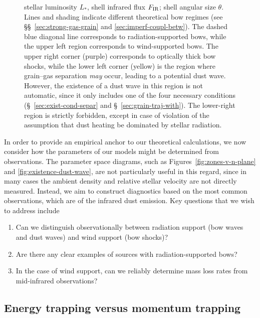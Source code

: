 \message{ !name(bs-bw-dw-03.tex)}\documentclass[useAMS, usenatbib, a4paper]{mnras}
\begin{document}
\begin{figure}
{    stellar luminosity \(L_*\), shell infrared flux \(F_{\text{IR}}\); shell
    angular size \(\theta\).  Lines and shading indicate different
    theoretical bow regimes (see \S\S~\ref{sec:strong-gas-grain} and
    \ref{sec:imperf-coupl-betw}).  The dashed blue diagonal line
    corresponds to radiation-supported bows, while the upper left
    region corresponds to wind-supported bows.  The upper right corner
    (purple) corresponds to optically thick bow shocks, while the
    lower left corner (yellow) is the region where grain--gas
    separation \textit{may} occur, leading to a potential dust wave.
    However, the existence of a dust wave in this region is not
    automatic, since it only includes one of the four necessary
    conditions (\S~\ref{sec:exist-cond-separ} and
    \S~\ref{sec:grain-traj-with}). The lower-right region is strictly
    forbidden, except in case of violation of the assumption that dust
    heating be dominated by stellar radiation. }
  \label{fig:All-sources-eta-tau}
\end{figure}


In order to provide an empirical anchor to our theoretical
calculations, we now consider how the parameters of our models might
be determined from observations.  The parameter space diagrams, such
as Figures~\ref{fig:zones-v-n-plane} and
\ref{fig:existence-dust-wave}, are not particularly useful in this
regard, since in many cases the ambient density and relative stellar
velocity are not directly measured.  Instead, we aim to construct
diagnostics based on the most common observations, which are of the
infrared dust emission.  Key questions that we wish to address include
\begin{enumerate}[1.]
\item Can we distinguish observationally between radiation support
  (bow waves and dust waves) and wind support (bow shocks)?
\item Are there any clear examples of sources with radiation-supported bows?
\item In the case of wind support, can we reliably determine mass loss
  rates from mid-infrared observations?
\end{enumerate}


\subsection{Energy trapping versus momentum trapping}
\label{sec:energy-trapp-vers}
\end{document}
